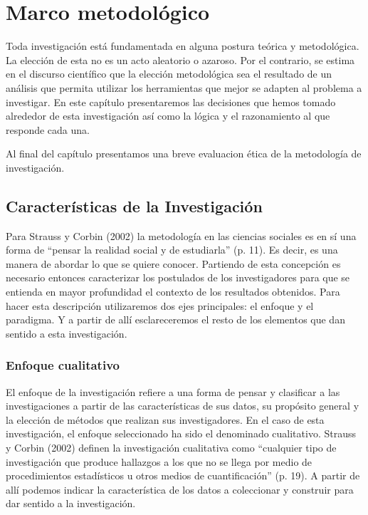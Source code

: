 \chapter{Marco metodológico}\label{ch:metodologia}
Toda investigación está fundamentada en alguna postura teórica y metodológica.
La elección de esta no es un acto aleatorio o azaroso.
Por el contrario, se estima en el discurso científico que la elección
metodológica sea el resultado de un análisis que permita utilizar los
herramientas que mejor se adapten al problema a investigar.
En este capítulo presentaremos las decisiones que hemos tomado alrededor de
esta investigación así como la lógica y el razonamiento al que responde cada
una.

Al final del capítulo presentamos una breve evaluacion ética de la
metodología de investigación.

\section{Características de la Investigación}
Para Strauss y Corbin (2002) la metodología en las ciencias sociales es en sí
una forma de “pensar la realidad social y de estudiarla” (p. 11).
Es decir, es una manera de abordar lo que se quiere conocer.
Partiendo de esta concepción es necesario entonces caracterizar los postulados
de los investigadores para que se entienda en mayor profundidad el contexto de
los resultados obtenidos.
Para hacer esta descripción utilizaremos dos ejes principales: el enfoque y el
paradigma.
Y a partir de allí esclareceremos el resto de los elementos que dan sentido a
esta investigación.

\subsection{Enfoque cualitativo}
El enfoque de la investigación refiere a una forma de pensar y clasificar a las
investigaciones a partir de las características de sus datos, su propósito
general y la elección de métodos que realizan sus investigadores.
En el caso de esta investigación, el enfoque seleccionado ha sido el denominado
cualitativo.
Strauss y Corbin (2002) definen la investigación cualitativa como “cualquier
tipo de investigación que produce hallazgos a los que no se llega por medio de
procedimientos estadísticos u otros medios de cuantificación” (p. 19).
A partir de allí podemos indicar la característica de los datos a coleccionar y
construir para dar sentido a la investigación.

